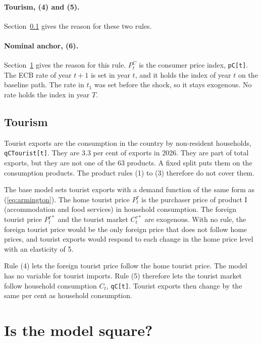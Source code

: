 \documentclass[11pt,a4paper]{article}
\newcommand{\code}[1]{\texttt{#1}}
\begin{document}
\paragraph{Tourism, (4) and (5).}
Section~\ref{sec:tourism} gives the reason for these two rules.

\paragraph{Nominal anchor, (6).}
Section~\ref{sec:square} gives the reason for this rule.
$P^{C}_t$ is the consumer price index, \code{pC[t]}. The ECB rate of year $t+1$ is set in year $t$, and it holds the index of year $t$ on the baseline path.
The rate in $t_1$ was set before the shock, so it stays exogenous. No rate holds the index in year $T$.

\subsection{Tourism}
\label{sec:tourism}

Tourist exports are the consumption in the country by non-resident households, \code{qCTourist[t]}. They are 3.3 per cent of exports in 2026.
They are part of total exports, but they are not one of the 63 products. A fixed split puts them on the consumption products.
The product rules (1) to (3) therefore do not cover them.

The base model sets tourist exports with a demand function of the same form as (\ref{eq:armington}).
The home tourist price $P^{\tau}_t$ is the purchaser price of product I (accommodation and food services) in household consumption. The foreign tourist price $P^{\tau*}_t$ and the tourist market $C^{\tau*}_t$ are exogenous.
With no rule, the foreign tourist price would be the only foreign price that does not follow home prices, and tourist exports would respond to each change in the home price level with an elasticity of 5.

Rule (4) lets the foreign tourist price follow the home tourist price.
The model has no variable for tourist imports. Rule (5) therefore lets the tourist market follow household consumption $C_t$, \code{qC[t]}.
Tourist exports then change by the same per cent as household consumption.

\section{Is the model square?}
\label{sec:square}
\end{document}
